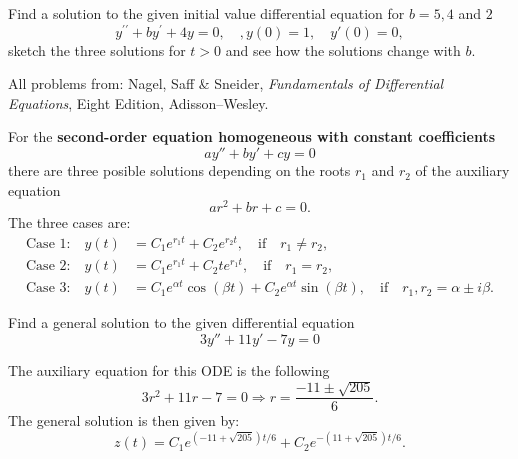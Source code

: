 \documentclass[11pt]{article}
\begin{document}
\begin{problem}
Find a solution to the given initial value differential equation for $b=5, 4$ and $2$
\begin{equation*}
y^{\prime \prime} + b y^{\prime} + 4 y =0, \quad, y(0)=1, \quad y'(0)=0,
\end{equation*}
sketch the three solutions for $t>0$ and see how the solutions change with $b$.
\end{problem}







\LabSolutions


All problems from: Nagel, Saff \& Sneider, \textit{Fundamentals of Differential Equations}, Eight Edition, Adisson--Wesley.


\begin{preamble}
\begin{formulaitem}
     \item For the \textbf{second-order equation homogeneous with constant coefficients}
     \[ay''+by'+cy=0\]
     there are three posible solutions depending on the roots $r_{1}$ and $r_{2}$ of the auxiliary equation 
     \[ar^{2}+br+c=0.\]
     The three cases are:
     \begin{align*}
     \text{Case 1:} \quad y(t)&=C_{1}e^{r_{1}t}+C_{2}e^{r_{2}t}, \quad \text{if}\quad r_{1}\neq r_{2}, \\
     \text{Case 2:} \quad y(t)&=C_{1}e^{r_{1}t}+C_{2}te^{r_{1}t}, \quad \text{if}\quad r_{1}= r_{2}, \\
     \text{Case 3:} \quad y(t)&=C_{1}e^{\alpha t}\cos(\beta t )+C_{2}e^{\alpha t}\sin(\beta t ), \quad \text{if}\quad r_{1}, r_{2} = \alpha \pm i \beta.
     \end{align*}
\end{formulaitem}

\end{preamble}



\begin{problem}
Find a general solution to the given differential equation
\begin{equation*}
3y'' + 11y' - 7 y =0
\end{equation*}
\end{problem}
\begin{solution}
The auxiliary equation for this ODE is the following
\begin{equation*}
3r^2 +11r -7 =0 \Rightarrow r = \frac{-11\pm \sqrt{205}}{6}.
\end{equation*}
The general solution is then given by:
\begin{equation*}
\boxed{ z(t) = C_{1} e^{(-11 + \sqrt{205}) t/6} + C_{2} e^{-(11 + \sqrt{205})t/6}}.
\end{equation*}
\end{solution}
\end{document}

